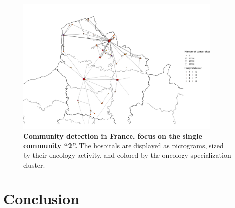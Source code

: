 \begin{figure}[h!]
    \includegraphics[width=0.9\textwidth]{images/co-occurrences/fig2.png}
    \centering
    \caption{ \textbf{Community detection in France, focus on the single
            community ``2''.} The hospitals are displayed as pictograms, sized by
        their oncology activity, and colored by the oncology specialization
        cluster. }
    \label{fig:co-occ-cluster}
\end{figure}

\section{Conclusion}

